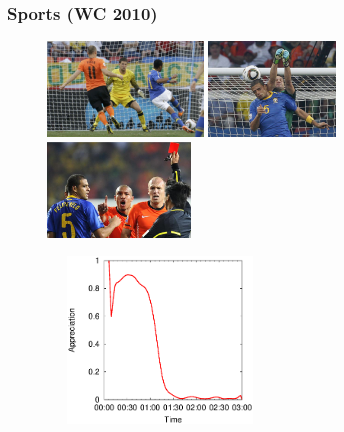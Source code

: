 \documentclass[14pt]{beamer}
\begin{document}
\begin{frame}\frametitle{Sports (WC 2010)}

\vspace{-0.1in}
\begin{figure}
\centering
\includegraphics[height=1.00in]{golrobinho.eps}
\includegraphics[height=1.00in]{contra.eps}
\includegraphics[height=1.00in]{vermelho.eps}
\end{figure}

\vspace{-0.15in}
\begin{figure}
\centering
\includegraphics[width=2.35in,height=1.75in]{felipemeloPositividade.eps}
\end{figure}

\end{frame}


\end{document}
